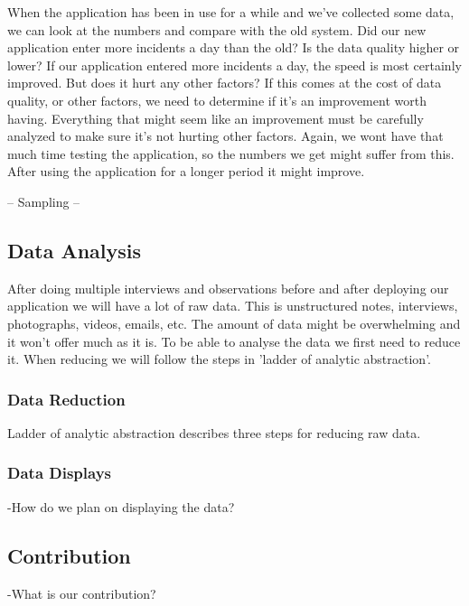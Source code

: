\documentclass[UKenglish, 12pt]{article}
\begin{document}
When the application has been in use for a while and we've collected some data,
we can look at the numbers and compare with the old system. Did our new
application enter more incidents a day than the old? Is the data quality higher
or lower?  If our application entered more incidents a day, the speed is most
certainly improved. But does it hurt any other factors? If this comes at the
cost of data quality, or other factors, we need to determine if it's an
improvement worth having. Everything that might seem like an improvement must be
carefully analyzed to make sure it's not hurting other factors. Again, we wont
have that much time testing the application, so the numbers we get might suffer
from this.  After using the application for a longer period it might improve.

-- Sampling --

\subsection*{Data Analysis}

After doing multiple interviews and observations before and after deploying our
application we will have a lot of raw data. This is unstructured notes,
interviews, photographs, videos, emails, etc. The amount of data might be 
overwhelming and it won't offer much as it is. To be able to analyse the data we
first need to reduce it. When reducing we will follow the steps in 'ladder of
analytic abstraction'.

\subsubsection*{Data Reduction}

Ladder of analytic abstraction describes three steps for reducing raw data.  

\subsubsection*{Data Displays}
-How do we plan on displaying the data?

\subsection*{Contribution}
-What is our contribution?

\printbibliography
\end{document}
